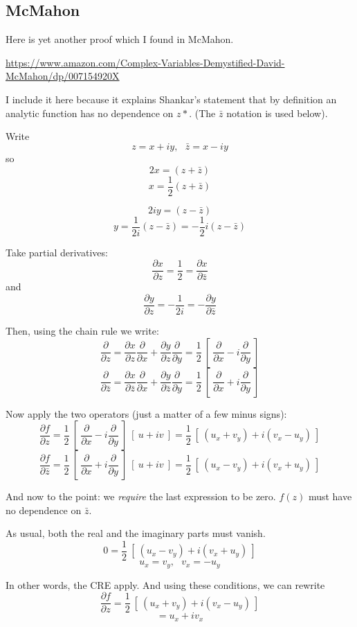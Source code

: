 \documentclass[11pt, oneside]{article}
\begin{document}
\subsection*{McMahon}
Here is yet another proof which I found in McMahon.  

\url{https://www.amazon.com/Complex-Variables-Demystified-David-McMahon/dp/007154920X}

I include it here because it explains Shankar's statement that by definition an analytic function has no dependence on $z*$.  (The $\bar{z}$ notation is used below).

Write
\[ z = x + iy , \ \ \  \bar{z} = x - iy \]
so
\[ 2x = (z + \bar{z})  \]
\[ x = \frac{1}{2} (z + \bar{z})  \]

\[ 2iy = (z - \bar{z}) \]
\[ y = \frac{1}{2i} (z - \bar{z}) = - \frac{1}{2} i (z - \bar{z})\]

Take partial derivatives:
\[ \frac{\partial x}{\partial z} = \frac{1}{2} = \frac{\partial x}{\partial \bar{z}} \]
and
\[ \frac{\partial y}{\partial z} = -\frac{1}{2i}  = -\frac{\partial y}{\partial \bar{z}} \]

Then, using the chain rule we write:
\[ \frac{\partial}{\partial z} =  \frac{\partial x}{\partial z}  \frac{\partial}{\partial x} + \frac{\partial y}{\partial z}  \frac{\partial}{\partial y} = \frac{1}{2} \ [ \ \frac{\partial}{\partial x} - i \frac{\partial}{\partial y} \ ] \]
\[ \frac{\partial}{\partial \bar{z}} =  \frac{\partial x}{\partial \bar{z}}  \frac{\partial}{\partial x} + \frac{\partial y}{\partial \bar{z}}  \frac{\partial}{\partial y} = \frac{1}{2} \ [ \ \frac{\partial}{\partial x} + i \frac{\partial}{\partial y} \ ] \]

Now apply the two operators (just a matter of a few minus signs):
\[ \frac{\partial f}{\partial z} =  \frac{1}{2} \ [ \ \frac{\partial}{\partial x} - i \frac{\partial}{\partial y} \ ]  \ [ \ u + iv \ ] = \frac{1}{2} \ [ \ (u_x + v_y) + i( v_x - u_y) \ ] \]
\[ \frac{\partial f}{\partial \bar{z}} =  \frac{1}{2} \ [ \ \frac{\partial}{\partial x} + i \frac{\partial}{\partial y} \ ]  \ [ \ u + iv \ ] = \frac{1}{2} \ [ \ (u_x - v_y) + i( v_x + u_y) \ ] \]

And now to the point:  we \emph{require} the last expression to be zero.  $f(z)$ must have no dependence on $\bar{z}$.

As usual, both the real and the imaginary parts must vanish.
\[ 0 = \frac{1}{2} \ [ \ (u_x - v_y) + i( v_x + u_y) \ ] \]
\[ u_x = v_y, \ \ \ v_x = - u_y \]

In other words, the CRE apply.  And using these conditions, we can rewrite
\[ \frac{\partial f}{\partial z} = \frac{1}{2} \ [ \ (u_x + v_y) + i( v_x - u_y) \ ] \]
\[ = u_x +  iv_x \]
\end{document}
